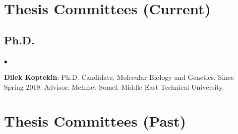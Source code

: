 \documentclass[margin,line]{res}
\newenvironment{list2}{
  \begin{list}{$\bullet$}{%
      \setlength{\itemsep}{0.1cm}
      \setlength{\parsep}{0in} \setlength{\parskip}{0in}
      \setlength{\topsep}{0in} \setlength{\partopsep}{0in} 
      \setlength{\leftmargin}{0.2in}}}{\end{list}}
\begin{document}
\begin{resume}
\section{\sc Thesis Committees (Current)}

\vspace*{-.4cm}
\subsection{\small \sc Ph.D.}
\begin{list2}
\item
{\bf Dilek Koptekin}: Ph.D. Candidate, Molecular Biology and Genetics, Since Spring 2019.
Advisor: Mehmet Somel. Middle East Technical University.
\end{list2}

\section{\sc Thesis Committees (Past)}

\vspace*{-.4cm}

\end{resume}
\end{document}
